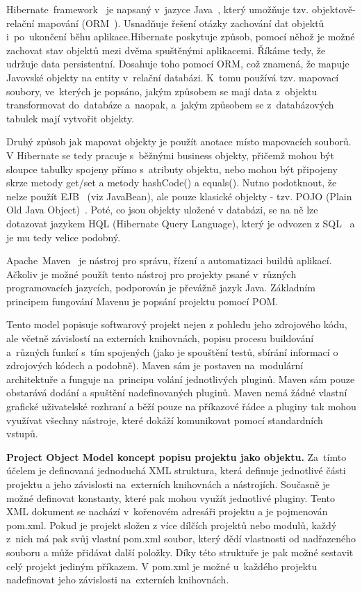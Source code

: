 Hibernate~framework~\cite{hibernate-framework} je napsaný v~jazyce Java~\cite{java}, který umožňuje tzv. objektově-relační mapování (ORM~\cite{orm}). Usnadňuje řešení otázky zachování dat objektů i~po~ukončení běhu aplikace.Hibernate poskytuje způsob, pomocí něhož je možné zachovat stav objektů mezi dvěma spuštěnými aplikacemi. Říkáme tedy, že udržuje data persistentní. Dosahuje toho pomocí ORM, což znamená, že mapuje Javovské objekty na entity v~relační databázi. K~tomu používá tzv. mapovací soubory, ve~kterých je popsáno, jakým způsobem se mají data z~objektu transformovat do~databáze a~naopak, a~jakým způsobem se z~databázových tabulek mají vytvořit objekty. 

Druhý způsob jak mapovat objekty je použít anotace místo mapovacích souborů. V Hibernate se tedy pracuje s~běžnými business objekty, přičemž mohou být sloupce tabulky spojeny přímo s~atributy objektu, nebo mohou být připojeny skrze metody get/set a metody hashCode() a equals(). Nutno podotknout, že nelze použít EJB~\cite{enterprise-javabeans} (viz JavaBean), ale pouze klasické objekty - tzv. POJO (Plain Old Java Object)~\cite{pojo}. Poté, co jsou objekty uložené v databázi, se na ně lze dotazovat jazykem HQL (Hibernate Query Language), který je odvozen z SQL~\cite{sql} a je mu tedy velice podobný.

Apache~Maven~\cite{apache-maven} je nástroj pro správu, řízení a automatizaci buildů aplikací. Ačkoliv je možné použít tento nástroj pro projekty psané v~různých programovacích jazycích, podporován je převážně jazyk Java. Základním principem fungování Mavenu je popsání projektu pomocí POM. 

Tento model popisuje softwarový projekt nejen z pohledu jeho zdrojového kódu, ale včetně závislostí na externích knihovnách, popisu procesu buildování a~různých funkcí s~tím spojených (jako je spouštění testů, sbírání informací o zdrojových kódech a podobně). Maven sám je postaven na~modulární architektuře a funguje na~principu volání jednotlivých pluginů. Maven sám pouze obstarává dodání a spuštění nadefinovaných pluginů. Maven nemá žádné vlastní grafické uživatelské rozhraní a běží pouze na příkazové řádce a pluginy tak mohou využívat všechny nástroje, které dokáží komunikovat pomocí standardních vstupů. 

\textbf{Project Object Model koncept popisu projektu jako objektu.} Za~tímto účelem je definovaná jednoduchá XML struktura, která definuje jednotlivé části projektu a jeho závislosti na~externích knihovnách a nástrojích. Současně je možné definovat konstanty, které pak mohou využít jednotlivé pluginy. Tento XML dokument se nachází v~kořenovém adresáři projektu a je pojmenován pom.xml. Pokud je projekt složen z více dílčích projektů nebo modulů, každý z~nich má pak svůj vlastní pom.xml soubor, který dědí vlastnosti od nadřazeného souboru a může přidávat další položky. Díky této struktuře je pak možné sestavit celý projekt jediným příkazem. V pom.xml je možné u~každého projektu nadefinovat jeho závislosti na~externích knihovnách. 


